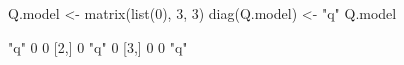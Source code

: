 \begin{Schunk}
\begin{Sinput}
 Q.model <- matrix(list(0), 3, 3)
 diag(Q.model) <- "q"
 Q.model
\end{Sinput}
\begin{Soutput}
     [,1] [,2] [,3]
[1,] "q"  0    0   
[2,] 0    "q"  0   
[3,] 0    0    "q" 
\end{Soutput}
\end{Schunk}
